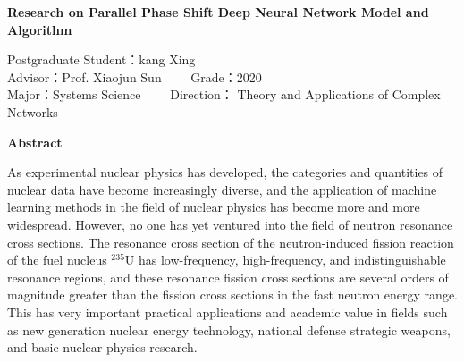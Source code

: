\begin{center}
\xiaoerhao\bf Research on Parallel Phase Shift Deep Neural Network Model and Algorithm
\end{center}
\vspace{0.7cm}
\begin{center}
	Postgraduate Student：kang Xing  ~~ \\
	Advisor：Prof. Xiaojun Sun  ~~~~Grade：2020\\
	Major：Systems Science	~~~~Direction： Theory and Applications of Complex Networks\\%
\end{center}
\vspace{0.5cm}
\centerline{\bf\sanhao Abstract}
\vspace{0.1cm}
\par
As experimental nuclear physics has developed, the categories and quantities of nuclear data have become increasingly diverse, and the application of machine learning methods in the field of nuclear physics has become more and more widespread. However, no one has yet ventured into the field of neutron resonance cross sections. The resonance cross section of the neutron-induced fission reaction of the fuel nucleus $^{235}$U has low-frequency, high-frequency, and indistinguishable resonance regions, and these resonance fission cross sections are several orders of magnitude greater than the fission cross sections in the fast neutron energy range. This has very important practical applications and academic value in fields such as new generation nuclear energy technology, national defense strategic weapons, and basic nuclear physics research.

